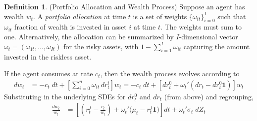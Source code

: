 \documentclass[12pt]{article}
\theoremstyle{plain}
\theoremstyle{definition}
\newtheorem{defn}[thm]{Definition}
\theoremstyle{remark}
\newcommand{\sumin}{\sum^n_{i=1}}
\newcommand{\suminz}{\sum^n_{i=0}}
\begin{document}
\begin{defn}(Portfolio Allocation and Wealth Process)
Suppose an agent has wealth $w_t$.
A \emph{portfolio allocation} at time $t$ is a set of weights
$\{\omega_{it}\}_{i=0}^I$ such that $\omega_{it}$ fraction of wealth is
invested in asset $i$ at time $t$. The weights must sum to one.
Alternatively, the allocation can be summarized by $I$-dimensional
vector $\omega_t=(\omega_{1t},\ldots,\omega_{It})$ for the risky assets,
with $1-\sum_{i=1}^I \omega_{it}$ capturing the amount invested in the
riskless asset.

If the agent consumes at rate $c_t$, then the wealth process evolves
according to
\begin{align*}
  dw_t
  &
  =
  -c_t\;dt
  +
  \left[
  \sum_{i=0}^n
  \omega_{it}
  \,dr_t^i
  \right]
  w_t
  =
  -c_t\;dt
  +
  \left[
  dr_t^0
  +
  \omega_{t}'
  \left(
  dr_t
  -
  dr_t^0
  \mathbf{1}
  \right)
  \right]
  w_t
\end{align*}
Substituting in the underlying SDEs for $dr_t^0$ and $dr_t$ (from above)
and regrouping,
\begin{align}
  \frac{dw_t}{w_t}
  &=
  \left[
  \left(r^f_t -\frac{c_t}{w_t}\right)
  +
  \omega_{t}'
  \big(\mu_t - r^f_t\mathbf{1}\big)
  \right]
  dt
  +
  \omega_{t}'
  \sigma_t
  \;dZ_t
  \label{dw/w}
\end{align}


\end{defn}
\end{document}
